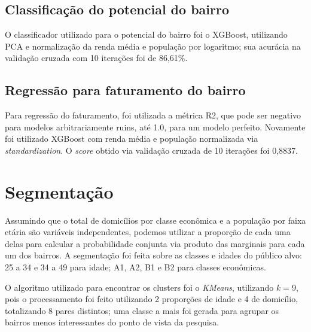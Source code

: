 \documentclass[10pt, a4paper]{article}
\begin{document}
\subsection{Classificação do potencial do bairro}

O classificador utilizado para o potencial do bairro foi o XGBoost,
utilizando PCA e normalização da renda média e população por
logaritmo; sua acurácia na validação cruzada com 10 iterações foi de
86,61\%.

\subsection{Regressão para faturamento do bairro}

Para regressão do faturamento, foi utilizada a métrica R2, que pode
ser negativo para modelos arbitrariamente ruins, até 1.0, para um
modelo perfeito. Novamente foi utilizado XGBoost com renda média e
população normalizada via \emph{standardization}. O \emph{score}
obtido via validação cruzada de 10 iterações foi 0,8837.

\section{Segmentação}

Assumindo que o total de domicílios por classe econômica e a população
por faixa etária são variáveis independentes, podemos utilizar a
proporção de cada uma delas para calcular a probabilidade conjunta via
produto das marginais para cada um dos bairros. A segmentação foi
feita sobre as classes e idades do público alvo: 25 a 34 e 34 a 49
para idade; A1, A2, B1 e B2 para classes econômicas.

O algoritmo utilizado para encontrar os clusters foi o \emph{KMeans},
utilizando $k=9$, pois o processamento foi feito utilizando 2
proporções de idade e 4 de domicílio, totalizando 8 pares distintos;
uma classe a mais foi gerada para agrupar os bairros menos
interessantes do ponto de vista da pesquisa.
\end{document}
